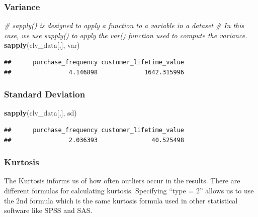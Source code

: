 \documentclass[
]{article}
\newenvironment{Shaded}{\begin{snugshade}}{\end{snugshade}}
\newcommand{\CommentTok}[1]{\textcolor[rgb]{0.56,0.35,0.01}{\textit{#1}}}
\newcommand{\FunctionTok}[1]{\textcolor[rgb]{0.13,0.29,0.53}{\textbf{#1}}}
\newcommand{\NormalTok}[1]{#1}
\begin{document}
\subsubsection{\texorpdfstring{\textbf{Variance}}{Variance}}\label{variance}

\begin{Shaded}
\begin{Highlighting}[]
\CommentTok{\# \textasciigrave{}sapply()\textasciigrave{} is designed to apply a function to a variable in a dataset}
\CommentTok{\# In this case, we use \textasciigrave{}sapply()\textasciigrave{} to apply the \textasciigrave{}var()\textasciigrave{} function used to compute the variance.}
\FunctionTok{sapply}\NormalTok{(clv\_data[,], var)}
\end{Highlighting}
\end{Shaded}

\begin{verbatim}
##      purchase_frequency customer_lifetime_value 
##                4.146898             1642.315996
\end{verbatim}

\subsubsection{\texorpdfstring{\textbf{Standard
Deviation}}{Standard Deviation}}\label{standard-deviation}

\begin{Shaded}
\begin{Highlighting}[]
\FunctionTok{sapply}\NormalTok{(clv\_data[,], sd)}
\end{Highlighting}
\end{Shaded}

\begin{verbatim}
##      purchase_frequency customer_lifetime_value 
##                2.036393               40.525498
\end{verbatim}

\subsubsection{\texorpdfstring{\textbf{Kurtosis}}{Kurtosis}}\label{kurtosis}

The Kurtosis informs us of how often outliers occur in the results.
There are different formulas for calculating kurtosis. Specifying ``type
= 2'' allows us to use the 2nd formula which is the same kurtosis
formula used in other statistical software like SPSS and SAS.
\end{document}

